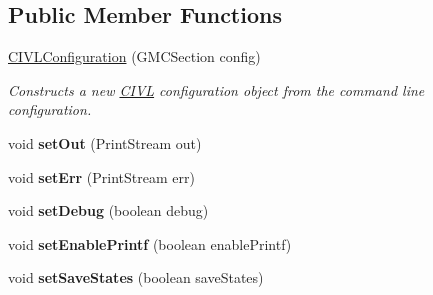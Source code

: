 \subsection*{Public Member Functions}
\begin{DoxyCompactItemize}
\item 
\hyperlink{classedu_1_1udel_1_1cis_1_1vsl_1_1civl_1_1config_1_1IF_1_1CIVLConfiguration_a84d773fe95895b7ca45be2db77d1c7ae}{C\+I\+V\+L\+Configuration} (G\+M\+C\+Section config)
\begin{DoxyCompactList}\small\item\em Constructs a new \hyperlink{classedu_1_1udel_1_1cis_1_1vsl_1_1civl_1_1CIVL}{C\+I\+V\+L} configuration object from the command line configuration. \end{DoxyCompactList}\item 
\hypertarget{classedu_1_1udel_1_1cis_1_1vsl_1_1civl_1_1config_1_1IF_1_1CIVLConfiguration_a911ca8bd607f98ab4d157d64cf12336d}{}void {\bfseries set\+Out} (Print\+Stream out)\label{classedu_1_1udel_1_1cis_1_1vsl_1_1civl_1_1config_1_1IF_1_1CIVLConfiguration_a911ca8bd607f98ab4d157d64cf12336d}

\item 
\hypertarget{classedu_1_1udel_1_1cis_1_1vsl_1_1civl_1_1config_1_1IF_1_1CIVLConfiguration_a390ba7584ec4ff66bf1aef0549cef049}{}void {\bfseries set\+Err} (Print\+Stream err)\label{classedu_1_1udel_1_1cis_1_1vsl_1_1civl_1_1config_1_1IF_1_1CIVLConfiguration_a390ba7584ec4ff66bf1aef0549cef049}

\item 
\hypertarget{classedu_1_1udel_1_1cis_1_1vsl_1_1civl_1_1config_1_1IF_1_1CIVLConfiguration_a563a6cfeaf1eaa685f70db12c6fcd287}{}void {\bfseries set\+Debug} (boolean debug)\label{classedu_1_1udel_1_1cis_1_1vsl_1_1civl_1_1config_1_1IF_1_1CIVLConfiguration_a563a6cfeaf1eaa685f70db12c6fcd287}

\item 
\hypertarget{classedu_1_1udel_1_1cis_1_1vsl_1_1civl_1_1config_1_1IF_1_1CIVLConfiguration_adbf6a4ac15d8fb48a8144f99f4d29898}{}void {\bfseries set\+Enable\+Printf} (boolean enable\+Printf)\label{classedu_1_1udel_1_1cis_1_1vsl_1_1civl_1_1config_1_1IF_1_1CIVLConfiguration_adbf6a4ac15d8fb48a8144f99f4d29898}

\item 
\hypertarget{classedu_1_1udel_1_1cis_1_1vsl_1_1civl_1_1config_1_1IF_1_1CIVLConfiguration_a2010e4d2080b40b33d5eaf11e988878f}{}void {\bfseries set\+Save\+States} (boolean save\+States)\label{classedu_1_1udel_1_1cis_1_1vsl_1_1civl_1_1config_1_1IF_1_1CIVLConfiguration_a2010e4d2080b40b33d5eaf11e988878f}


\end{DoxyCompactItemize}
